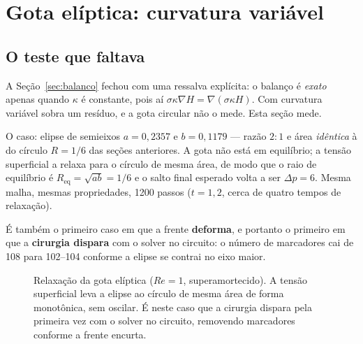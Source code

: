 \section{Gota el\'iptica: curvatura vari\'avel}
\label{sec:elipse}

\subsection{O teste que faltava}

A Se\c{c}\~ao~\ref{sec:balanco} fechou com uma ressalva expl\'icita: o balan\c{c}o
\'e \emph{exato} apenas quando $\kappa$ \'e constante, pois a\'i
$\sigma\kappa\nabla H = \nabla(\sigma\kappa H)$. Com curvatura vari\'avel sobra
um res\'iduo, e a gota circular n\~ao o mede. Esta se\c{c}\~ao mede.

O caso: elipse de semieixos $a=0{,}2357$ e $b=0{,}1179$ --- raz\~ao $2{:}1$ e
\'area \emph{id\^entica} \`a do c\'irculo $R=1/6$ das se\c{c}\~oes anteriores.
A gota n\~ao est\'a em equil\'ibrio; a tens\~ao superficial a relaxa para o
c\'irculo de mesma \'area, de modo que o raio de equil\'ibrio \'e
$R_{\text{eq}}=\sqrt{ab}=1/6$ e o salto final esperado volta a ser
$\Delta p = 6$. Mesma malha, mesmas propriedades, 1200 passos ($t=1{,}2$, cerca
de quatro tempos de relaxa\c{c}\~ao).

\'E tamb\'em o primeiro caso em que a frente \textbf{deforma}, e portanto o
primeiro em que a \textbf{cirurgia dispara} com o solver no circuito: o n\'umero
de marcadores cai de 108 para 102--104 conforme a elipse se contrai no eixo
maior.


\begin{figure}[htbp]
\centering
{}
\caption{Relaxa\c{c}\~ao da gota el\'iptica ($Re=1$, superamortecido). A
tens\~ao superficial leva a elipse ao c\'irculo de mesma \'area de forma
monot\^onica, sem oscilar. \'E neste caso que a cirurgia dispara pela primeira
vez com o solver no circuito, removendo marcadores conforme a frente encurta.}
\label{fig:elipse}
\end{figure}

